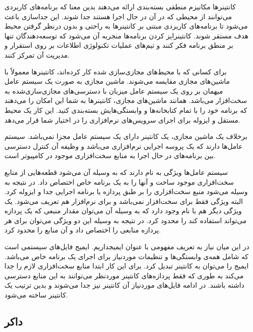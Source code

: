 کانتینرها مکانیزم منطقی بسته‌بندی ارائه می‌دهند بدین معنا که برنامه‌های کاربردی می‌توانند از محیطی که در آن در حال اجرا هستند جدا شوند. این جداسازی باعث می‌شود تا برنامه‌های کاربردی مبتنی بر کانتینرها به راحتی و بدون درنظر گرفتن محیط هدف مستقر شوند. کانتینرایز کردن برنامه‌ها منجربه آن می‌شود که توسعه‌دهندگان تنها بر منطق برنامه فکر کنند و تیم‌های عملیات تکنولوژی اطلاعات بر روی استقرار و مدیریت آن تمرکز کنند.

برای کسانی که با محیط‌های مجازی‌سازی شده کار کرده‌اند، کانتینرها معمولاً با ماشین‌های مجازی مقایسه می‌شوند. ماشین مجازی به صورت یک سیستم عامل میهمان بر روی یک سیستم عامل میزبان با دسترسی‌های مجازی‌سازی‌شده به سخت‌افزار می‌باشد. همانند ماشین‌های مجازی، کانتینرها به شما این امکان را می‌دهند که برنامه خود را با تمام کتابخانه‌ها و وابستگی‌هایش بسته‌بندی کنید. این کار یک محیط مستقل و ایزوله برای اجرای سرویس‌های نرم‌افزاری را در اختیار شما قرار می‌دهد. 

برخلاف یک ماشین مجازی، یک کانتینر دارای یک سیستم عامل مجزا نمی‌باشد. سیستم عامل‌ها
دارند که یک پروسه اجرایی نرم‌افزاری می‌باشد و وظیفه آن کنترل دسترسی بین برنامه‌های در حال اجرا به منابع سخت‌افزاری موجود در کامپیوتر است.

سیستم عامل‌ها ویژگی به نام
دارند که به وسیله آن می‌شود قطعه‌هایی از منابع سخت‌افزاری موجود ساخت و آنها را به یک برنامه خاص اختصاص داد. در نتیجه به وسیله
می‌شود منبع سخت‌افزاری را بر طبق  پردازه یا برنامه اجرایی جدا و ایزوله کرد. البته ویژگی
فقط برای سخت‌افزار نمی‌باشد و برای نرم‌افزار هم تعریف می‌شود. یک ویژگی دیگر هم با نام
وجود دارد که به وسیله آن می‌توان مقدار منبعی که یک پردازه می‌تواند استفاده کند را محدود کرد. در نتیجه به وسیله این دو ویژگی می‌توان برای هر پردازه منابعی را اختصاص داد و آن منابع را محدود کرد. 

در این میان نیاز به تعریف مفهومی با عنوان ایمیجداریم. ایمیج فایل‌های سیستمی است که شامل همه‌ی وابستگی‌ها و تنظیمات موردنیاز برای اجرای یک برنامه خاص می‌باشد. ایمیج را می‌توان به کانتینر تبدیل کرد. برای این کار ابتدا
منابع سخت‌افزاری لازم را جدا می‌کند به طوری که فقط پردازه‌های کانتینر موردنظر می‌توانند به این منابع دسترسی داشته باشند. در ادامه فایل‌های موردنیاز آن کانتینر نیز جدا می‌شوند و بدین ترتیب یک کانتینر ساخته می‌شود.


\subsection{داکر}

